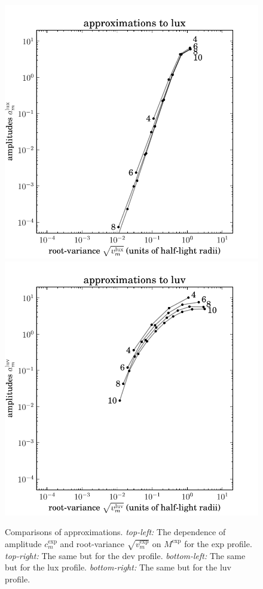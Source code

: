 \documentclass[12pt,pdftex,preprint]{aastex}
\newlength{\figurewidth}
\begin{document}
\begin{figure}
\includegraphics[width=\figurewidth]{mixtures_vs_K_lux.pdf}%
\includegraphics[width=\figurewidth]{mixtures_vs_K_luv.pdf}
\caption{Comparisons of approximations.  \textsl{top-left:} The
  dependence of amplitude $c^{\exp}_m$ and root-variance
  $\sqrt{v^{\exp}_m}$ on $M^{\exp}$ for the exp profile.
  \textsl{top-right:} The same but for the dev profile.
  \textsl{bottom-left:} The same but for the lux profile.
  \textsl{bottom-right:} The same but for the luv profile.\label{fig:M}}
\end{figure}
\end{document}
